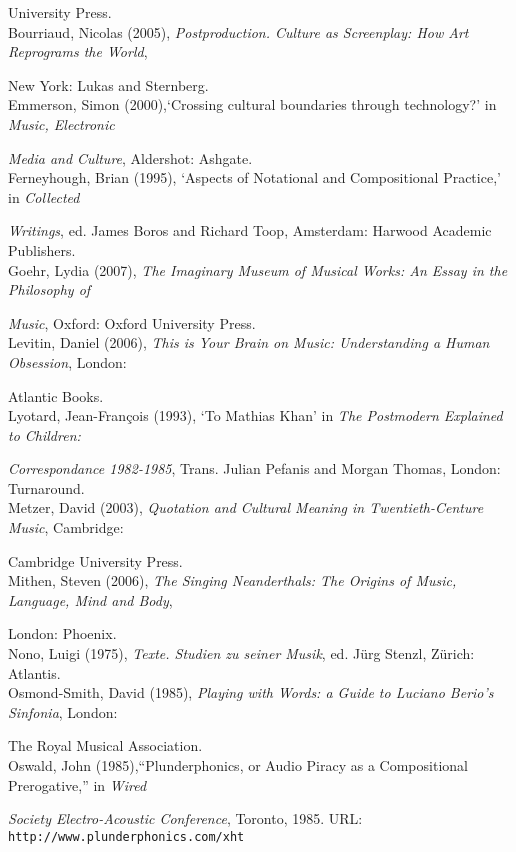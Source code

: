University Press.\\
Bourriaud, Nicolas (2005), \emph{Postproduction. Culture as Screenplay: How Art Reprograms the World}, 

New York: Lukas and Sternberg.\\
Emmerson, Simon (2000),`Crossing cultural boundaries through technology?'  in \emph{Music, Electronic}

\emph{Media and Culture}, Aldershot: Ashgate.\\
Ferneyhough, Brian (1995), `Aspects of Notational and Compositional Practice,' in \emph{Collected}

\emph{Writings}, ed. James Boros and Richard Toop, Amsterdam: Harwood Academic Publishers.\\
Goehr, Lydia (2007), \emph{The Imaginary Museum of Musical Works: An Essay in the Philosophy of}

\emph{Music}, Oxford: Oxford University Press.\\
Levitin, Daniel (2006), \emph{This is Your Brain on Music: Understanding a Human Obsession}, London: 

Atlantic Books.\\
Lyotard, Jean-Fran\c{c}ois (1993), `To Mathias Khan' in \emph{The Postmodern Explained to Children:} 

\emph{Correspondance 1982-1985}, Trans. Julian Pefanis and Morgan Thomas, London: Turnaround.\\
Metzer, David (2003), \emph{Quotation and Cultural Meaning in Twentieth-Centure Music}, Cambridge: 

Cambridge University Press.\\
Mithen, Steven (2006), \emph{The Singing Neanderthals: The Origins of Music, Language, Mind and Body}, 

London: Phoenix.\\
Nono, Luigi (1975), \emph{Texte. Studien zu seiner Musik}, ed. J\"{u}rg Stenzl, Z\"{u}rich: Atlantis.\\
Osmond-Smith, David (1985), \emph{Playing with Words: a Guide to Luciano Berio's Sinfonia},  London: 

The Royal Musical Association.\\
Oswald, John (1985),``Plunderphonics, or Audio Piracy as a Compositional Prerogative,'' in \emph{Wired}

\emph{Society Electro-Acoustic Conference}, Toronto, 1985. URL: \texttt{http://www.plunderphonics.com/xht}

